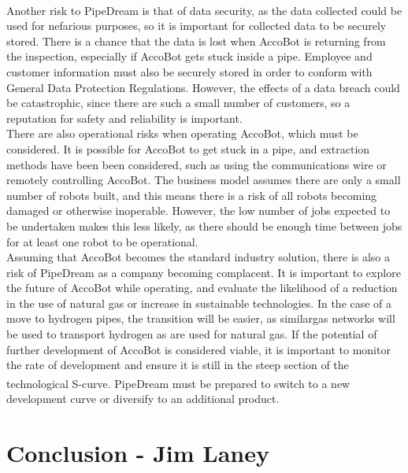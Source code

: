 \documentclass[11pt]{article}		%
\newcommand{\supercite}[1]{\textsuperscript{\cite{#1}}}		%
\begin{document}
	     \\ 
            \hspace*{3ex}Another risk to PipeDream is that of data security, as the data collected could be used for nefarious purposes, so it is important for collected data to be securely stored.
	     	There is a chance that the data is lost when AccoBot is returning from the inspection, especially if AccoBot gets stuck inside a pipe.
	     	Employee and customer information must also be securely stored in order to conform with General Data Protection Regulations.
	     	However, the effects of a data breach could be catastrophic, since there are such a small number of customers, so a reputation for safety and reliability is important.
	     	\\ 
            \hspace*{3ex}There are also operational risks when operating AccoBot, which must be considered.
	     	It is possible for AccoBot to get stuck in a pipe, and extraction methods have been been considered, such as using the communications wire or remotely controlling AccoBot.
	     	The business model assumes there are only a small number of robots built, and this means there is a risk of all robots becoming damaged or otherwise inoperable.
	     	However, the low number of jobs expected to be undertaken makes this less likely, as there should be enough time between jobs for at least one robot to be operational.
	     	\\ 
            \hspace*{3ex}Assuming that AccoBot becomes the standard industry solution, there is also a risk of PipeDream as a company becoming complacent.
	     	It is important to explore the future of AccoBot while operating, and evaluate the likelihood of a reduction in the use of natural gas or increase in sustainable technologies.
	     	In the case of a move to hydrogen pipes, the transition will be easier, as similargas networks will be used to transport hydrogen as are used for natural gas.
	     	If the potential of further development of AccoBot is considered viable, it is important to monitor the rate of development and ensure it is still in the steep section of the technological S-curve\supercite{christensen1998innovation}.
	     	PipeDream must be prepared to switch to a new development curve or diversify to an additional product.
			    
    \section[Conclusion]{Conclusion - Jim Laney}
        
\end{document}
